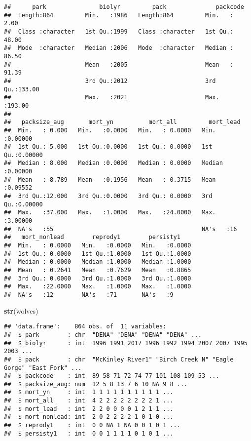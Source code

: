 \documentclass[
]{article}
\newenvironment{Shaded}{\begin{snugshade}}{\end{snugshade}}
\newcommand{\FunctionTok}[1]{\textcolor[rgb]{0.13,0.29,0.53}{\textbf{#1}}}
\newcommand{\NormalTok}[1]{#1}
\begin{document}
\begin{verbatim}
##      park               biolyr         pack              packcode     
##  Length:864         Min.   :1986   Length:864         Min.   :  2.00  
##  Class :character   1st Qu.:1999   Class :character   1st Qu.: 48.00  
##  Mode  :character   Median :2006   Mode  :character   Median : 86.50  
##                     Mean   :2005                      Mean   : 91.39  
##                     3rd Qu.:2012                      3rd Qu.:133.00  
##                     Max.   :2021                      Max.   :193.00  
##                                                                       
##   packsize_aug       mort_yn          mort_all         mort_lead      
##  Min.   : 0.000   Min.   :0.0000   Min.   : 0.0000   Min.   :0.00000  
##  1st Qu.: 5.000   1st Qu.:0.0000   1st Qu.: 0.0000   1st Qu.:0.00000  
##  Median : 8.000   Median :0.0000   Median : 0.0000   Median :0.00000  
##  Mean   : 8.789   Mean   :0.1956   Mean   : 0.3715   Mean   :0.09552  
##  3rd Qu.:12.000   3rd Qu.:0.0000   3rd Qu.: 0.0000   3rd Qu.:0.00000  
##  Max.   :37.000   Max.   :1.0000   Max.   :24.0000   Max.   :3.00000  
##  NA's   :55                                          NA's   :16       
##   mort_nonlead        reprody1        persisty1     
##  Min.   : 0.0000   Min.   :0.0000   Min.   :0.0000  
##  1st Qu.: 0.0000   1st Qu.:1.0000   1st Qu.:1.0000  
##  Median : 0.0000   Median :1.0000   Median :1.0000  
##  Mean   : 0.2641   Mean   :0.7629   Mean   :0.8865  
##  3rd Qu.: 0.0000   3rd Qu.:1.0000   3rd Qu.:1.0000  
##  Max.   :22.0000   Max.   :1.0000   Max.   :1.0000  
##  NA's   :12        NA's   :71       NA's   :9
\end{verbatim}

\begin{Shaded}
\begin{Highlighting}[]
\FunctionTok{str}\NormalTok{(wolves)}
\end{Highlighting}
\end{Shaded}

\begin{verbatim}
## 'data.frame':    864 obs. of  11 variables:
##  $ park        : chr  "DENA" "DENA" "DENA" "DENA" ...
##  $ biolyr      : int  1996 1991 2017 1996 1992 1994 2007 2007 1995 2003 ...
##  $ pack        : chr  "McKinley River1" "Birch Creek N" "Eagle Gorge" "East Fork" ...
##  $ packcode    : int  89 58 71 72 74 77 101 108 109 53 ...
##  $ packsize_aug: num  12 5 8 13 7 6 10 NA 9 8 ...
##  $ mort_yn     : int  1 1 1 1 1 1 1 1 1 1 ...
##  $ mort_all    : int  4 2 2 2 2 2 2 2 2 1 ...
##  $ mort_lead   : int  2 2 0 0 0 0 1 2 1 1 ...
##  $ mort_nonlead: int  2 0 2 2 2 2 1 0 1 0 ...
##  $ reprody1    : int  0 0 NA 1 NA 0 0 1 0 1 ...
##  $ persisty1   : int  0 0 1 1 1 1 0 1 0 1 ...
\end{verbatim}
\end{document}
